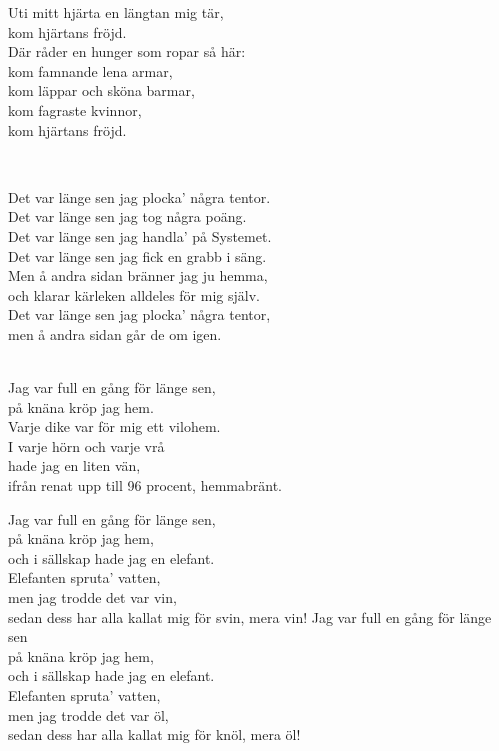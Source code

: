 {{Uti mitt hjärta en längtan mig tär,\\
kom hjärtans fröjd.\\
Där råder en hunger som ropar så här:\\
kom famnande lena armar,\\
kom läppar och sköna barmar,\\
kom fagraste kvinnor,\\
kom hjärtans fröjd.

\newpage

 \\       

\songtext{}
Det var länge sen jag plocka' några tentor.\\
Det var länge sen jag tog några poäng.\\
Det var länge sen jag handla' på Systemet.\\
Det var länge sen jag fick en grabb i säng.\\
Men å andra sidan bränner jag ju hemma,\\
och klarar kärleken alldeles för mig själv.\\
Det var länge sen jag plocka' några tentor,\\
men å andra sidan går de om igen. \\

 \\       

\songtext{}
Jag var full en gång för länge sen,\\
på knäna kröp jag hem.\\
Varje dike var för mig ett vilohem.\\
I varje hörn och varje vrå\\
hade jag en liten vän,\\
ifrån renat upp till 96 procent, hemmabränt.

Jag var full en gång för länge sen,\\
på knäna kröp jag hem,\\
och i sällskap hade jag en elefant.\\
Elefanten spruta' vatten,\\
men jag trodde det var vin,\\
sedan dess har alla kallat mig för svin, mera vin!
\newpage
Jag var full en gång för länge sen\\
på knäna kröp jag hem,\\
och i sällskap hade jag en elefant.\\
Elefanten spruta' vatten,\\
men jag trodde det var öl,\\
sedan dess har alla kallat mig för knöl, mera öl!

}}
